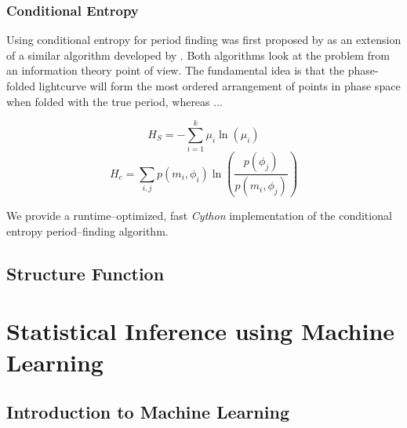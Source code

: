 
\subsubsection{Conditional Entropy}

Using conditional entropy for period finding was first proposed by \citet{graham2013} as an extension of a similar algorithm developed by \citet{cincotta1995}. Both algorithms look at the problem from an information theory point of view. The fundamental idea is that the phase-folded lightcurve will form the most ordered arrangement of points in phase space when folded with the true period, whereas ...

\begin{equation}
H_S = - \sum_{i=1}^k \mu_i \ln(\mu_i)
\end{equation}
\begin{equation}
H_c = \sum_{i,j} p(m_i, \phi_i) \ln(\frac{p(\phi_j)}{p(m_i, \phi_j)})
\end{equation}


We provide a runtime--optimized, fast \emph{Cython} implementation of the conditional entropy period--finding algorithm.

\subsection{Structure Function}

\section{Statistical Inference using Machine Learning}

\subsection{Introduction to Machine Learning}
\label{sec:introduction-machine-learning}

